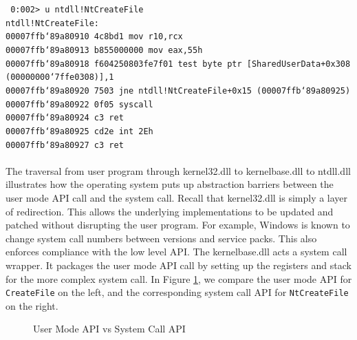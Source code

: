 \documentclass[preprint,12pt]{elsarticle}
\begin{document}
{\footnotesize{\texttt{
0:002> u ntdll!NtCreateFile\\
ntdll!NtCreateFile:\\
00007ffb`89a80910 4c8bd1 \space\space mov r10,rcx\\
00007ffb`89a80913 b855000000 \space mov eax,55h\\
00007ffb`89a80918 f604250803fe7f01 test byte ptr [SharedUserData+0x308 (00000000`7ffe0308)],1\\
00007ffb`89a80920 7503 \space\space\space jne ntdll!NtCreateFile+0x15 (00007ffb`89a80925)\\
00007ffb`89a80922 0f05 \space\space\space syscall\\
00007ffb`89a80924 c3 \space\space\space\space\space ret\\
00007ffb`89a80925 cd2e \space\space\space int 2Eh\\
00007ffb`89a80927 c3  \space\space\space\space\space ret
}}}\\\\
The traversal from user program through kernel32.dll to kernelbase.dll to ntdll.dll illustrates how the operating system puts up abstraction barriers between the user mode API call and the system call. Recall that kernel32.dll is simply a layer of redirection. This allows the underlying implementations to be updated and patched without disrupting the user program. For example, Windows is known to change system call numbers between versions and service packs. This also enforces compliance with the low level API. The kernelbase.dll acts a system call wrapper. It packages the user mode API call by setting up the registers and stack for the more complex system call. In Figure \ref{fig:API_vs_Syscall}, we compare the user mode API for \texttt{CreateFile} on the left, and the corresponding system call API for \texttt{NtCreateFile} on the right. 

\begin{figure}[ht]
\caption{User Mode API vs System Call API}
\label{fig:API_vs_Syscall}
\end{figure}
\end{document}
